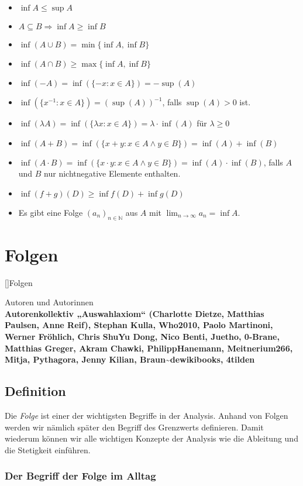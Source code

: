 \documentclass[fontsize=9pt,
               parskip=half-,
               DIV=14,
               listof=chapterentry,
               tocflat]{scrbook}
\newenvironment{authors}{\par\vspace*{\fill}\color{white}Autoren und
Autorinnen\\\bfseries}{\clearpage}
\begin{document}
\begin{itemize}
\item $\inf A\leq \sup A$
\item $A\subseteq B\Rightarrow \inf A\geq \inf B$
\item $\inf(A\cup B)=\min\{\inf A,\inf B\}$
\item $\inf(A\cap B)\geq \max\{\inf A,\inf B\}$
\item $\inf(-A)=\inf(\{-x:x\in A\})=-\sup(A)$
\item $\inf(\{x^{-1}:x\in A\})=(\sup(A))^{-1}$, falls $\sup(A)>0$ ist.
\item $\inf(\lambda A)=\inf(\{\lambda x:x\in A\})=\lambda \cdot \inf(A)$ für $\lambda \geq 0$
\item $\inf(A+B)=\inf(\{x+y:x\in A\land y\in B\})=\inf(A)+\inf(B)$
\item $\inf(A\cdot B)=\inf(\{x\cdot y:x\in A\land y\in B\})=\inf(A)\cdot \inf(B)$, falls $A$ und $B$ nur nichtnegative Elemente enthalten.
\item $\inf(f+g)(D)\geq \inf f(D)+\inf g(D)$
\item Es gibt eine Folge $(a_{n})_{n\in \mathbb {N} }$ aus $A$ mit $\lim _{n\rightarrow \infty }a_{n}=\inf A$.
\end{itemize}

\part{Folgen}

[]{Folgen}\begin{authors}
Autorenkollektiv „Auswahlaxiom“ (Charlotte Dietze, Matthias Paulsen, Anne Reif), Stephan Kulla, Who2010, Paolo Martinoni, Werner Fröhlich, Chris ShuYu Dong, Nico Benti, Juetho, 0-Brane, Matthias Greger, Akram Chawki, PhilippHanemann, Meitnerium266, Mitja, Pythagora, Jenny Kilian, Braun\textasciitilde{}dewikibooks, 4tilden\end{authors}

\chapter{Definition}

Die \emph{Folge} ist einer der wichtigsten Begriffe in der Analysis. Anhand von Folgen werden wir nämlich später den Begriff des Grenzwerts definieren. Damit wiederum können wir alle wichtigen Konzepte der Analysis wie die Ableitung und die Stetigkeit einführen.

\section{Der Begriff der Folge im Alltag}
\end{document}
